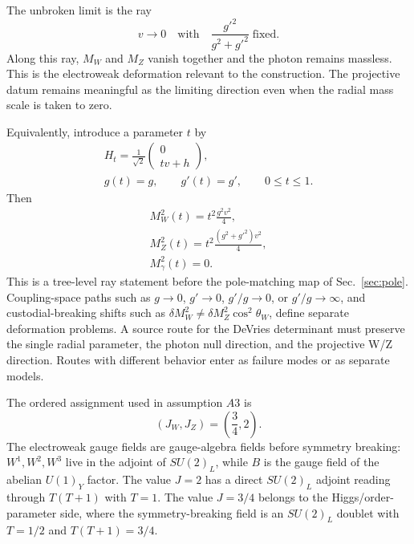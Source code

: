 The unbroken limit is the ray
\begin{equation}
  v\to0
  \quad\text{with}\quad
  \frac{g'^2}{g^2+g'^2}\;\text{fixed}.
  \label{eq:ew-ray}
\end{equation}
Along this ray, \(M_W\) and \(M_Z\) vanish together and the photon remains massless.  This is the electroweak deformation relevant to the construction.  The projective datum remains meaningful as the limiting direction even when the radial mass scale is taken to zero.

Equivalently, introduce a parameter \(t\) by
\begin{equation}
  \begin{gathered}
  H_t=\frac{1}{\sqrt2}
  \begin{pmatrix}0\\t v+h\end{pmatrix},\\
  g(t)=g,\qquad g'(t)=g',
  \qquad 0\le t\le1 .
  \end{gathered}
  \label{eq:ew-ray-family}
\end{equation}
Then
\begin{equation}
  \begin{gathered}
  M_W^2(t)=t^2\frac{g^2v^2}{4},\\
  M_Z^2(t)=t^2\frac{(g^2+g'^2)v^2}{4},\\
  M_\gamma^2(t)=0 .
  \end{gathered}
  \label{eq:ew-ray-family-masses}
\end{equation}
This is a tree-level ray statement before the pole-matching map of
Sec.~\ref{sec:pole}.  Coupling-space paths such as \(g\to0\), \(g'\to0\),
\(g'/g\to0\), or \(g'/g\to\infty\), and custodial-breaking shifts such as
\(\delta M_W^2\ne\delta M_Z^2\cos^2\theta_W\), define separate deformation
problems.  A source route for the DeVries determinant must preserve the
single radial parameter, the photon null direction, and the projective W/Z
direction.  Routes with different behavior enter as failure modes or as
separate models.

The ordered assignment used in assumption \(A3\) is
\begin{equation}
  (J_W,J_Z)=\left(\frac34,2\right).
  \label{eq:Jassignment}
\end{equation}
The electroweak gauge fields are gauge-algebra fields before symmetry breaking: \(W^1,W^2,W^3\) live in the adjoint of \(SU(2)_L\), while \(B\) is the gauge field of the abelian \(U(1)_Y\) factor.  The value \(J=2\) has a direct \(SU(2)_L\) adjoint reading through \(T(T+1)\) with \(T=1\).  The value \(J=3/4\) belongs to the Higgs/order-parameter side, where the symmetry-breaking field is an \(SU(2)_L\) doublet with \(T=1/2\) and \(T(T+1)=3/4\).

